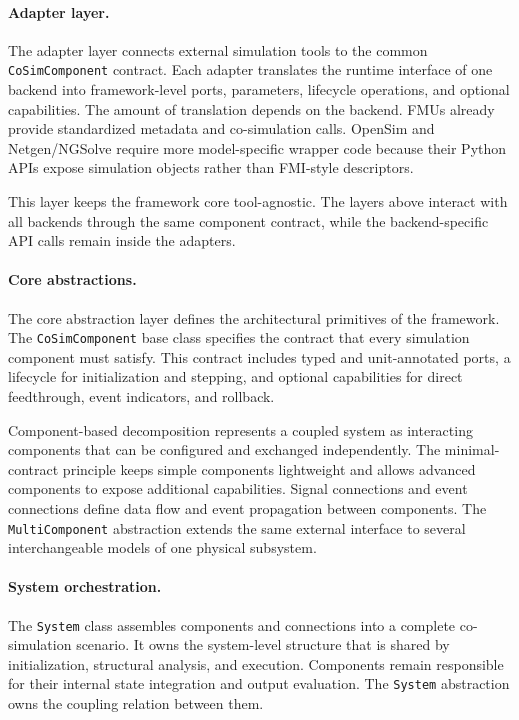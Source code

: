 \paragraph{Adapter layer.}
The adapter layer connects external simulation tools to the common \texttt{CoSimComponent} contract.
Each adapter translates the runtime interface of one backend into framework-level ports, parameters, lifecycle operations, and optional capabilities.
The amount of translation depends on the backend.
\acp{FMU} already provide standardized metadata and co-simulation calls.
OpenSim and Netgen/NGSolve require more model-specific wrapper code because their Python \acp{API} expose simulation objects rather than \ac{FMI}-style descriptors.

This layer keeps the framework core tool-agnostic.
The layers above interact with all backends through the same component contract, while the backend-specific \ac{API} calls remain inside the adapters.

\paragraph{Core abstractions.}
The core abstraction layer defines the architectural primitives of the framework.
The \texttt{CoSimComponent} base class specifies the contract that every simulation component must satisfy.
This contract includes typed and unit-annotated ports, a lifecycle for initialization and stepping, and optional capabilities for direct feedthrough, event indicators, and rollback.

Component-based decomposition represents a coupled system as interacting components that can be configured and exchanged independently.
The minimal-contract principle keeps simple components lightweight and allows advanced components to expose additional capabilities.
Signal connections and event connections define data flow and event propagation between components.
The \texttt{MultiComponent} abstraction extends the same external interface to several interchangeable models of one physical subsystem.

\paragraph{System orchestration.}
The \texttt{System} class assembles components and connections into a complete co-simulation scenario.
It owns the system-level structure that is shared by initialization, structural analysis, and execution.
Components remain responsible for their internal state integration and output evaluation.
The \texttt{System} abstraction owns the coupling relation between them.

